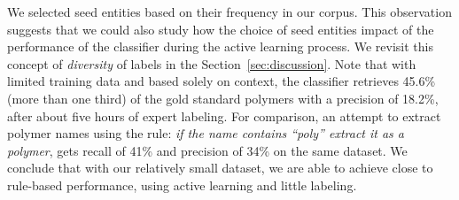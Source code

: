We selected seed entities based on their frequency in our corpus. %
This observation suggests that we could also study how the choice of seed entities impact of the performance of the classifier during the active learning process. 
We revisit this concept of \textit{diversity} of labels in the Section~\ref{sec:discussion}. 
Note that with limited training data and based solely on context, the classifier retrieves 45.6\% (more than one third) of the gold standard polymers with a precision of 18.2\%, after about five hours of expert labeling. 
For comparison, an attempt to extract polymer names using the rule: 
\textit{if the name contains ``poly'' extract it as a polymer}, gets recall of 41\% and precision of 34\% on the same dataset.
We conclude that with our relatively small dataset, we are able to achieve close to rule-based performance, 
using active learning and little labeling.

